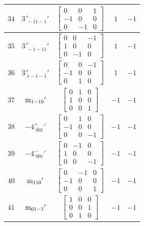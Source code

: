 \documentclass[fleqn,8pt]{jsarticle}
\begin{document}
\begin{longtable}{ccccc}
$ 34 $ & $ 3^{+}_{\,\,-11-1}{}' $ & $ \begin{bmatrix} 0 & 0 & 1 \\ -1 & 0 & 0 \\ 0 & -1 & 0 \end{bmatrix} $ & $ 1 $ & $ -1 $ \\ \hline
$ 35 $ & $ 3^{+}_{\,\,-1-11}{}' $ & $ \begin{bmatrix} 0 & 0 & -1 \\ 1 & 0 & 0 \\ 0 & -1 & 0 \end{bmatrix} $ & $ 1 $ & $ -1 $ \\ \hline
$ 36 $ & $ 3^{+}_{\,\,1-1-1}{}' $ & $ \begin{bmatrix} 0 & 0 & -1 \\ -1 & 0 & 0 \\ 0 & 1 & 0 \end{bmatrix} $ & $ 1 $ & $ -1 $ \\ \hline
$ 37 $ & $ {\rm m}_{1-10}{}' $ & $ \begin{bmatrix} 0 & 1 & 0 \\ 1 & 0 & 0 \\ 0 & 0 & 1 \end{bmatrix} $ & $ -1 $ & $ -1 $ \\ \hline
$ 38 $ & $ -4^{+}_{\,\,001}{}' $ & $ \begin{bmatrix} 0 & 1 & 0 \\ -1 & 0 & 0 \\ 0 & 0 & -1 \end{bmatrix} $ & $ -1 $ & $ -1 $ \\ \hline
$ 39 $ & $ -4^{-}_{\,\,001}{}' $ & $ \begin{bmatrix} 0 & -1 & 0 \\ 1 & 0 & 0 \\ 0 & 0 & -1 \end{bmatrix} $ & $ -1 $ & $ -1 $ \\ \hline
$ 40 $ & $ {\rm m}_{110}{}' $ & $ \begin{bmatrix} 0 & -1 & 0 \\ -1 & 0 & 0 \\ 0 & 0 & 1 \end{bmatrix} $ & $ -1 $ & $ -1 $ \\ \hline
$ 41 $ & $ {\rm m}_{01-1}{}' $ & $ \begin{bmatrix} 1 & 0 & 0 \\ 0 & 0 & 1 \\ 0 & 1 & 0 \end{bmatrix} $ & $ -1 $ & $ -1 $ \\ \hline

\end{longtable}
\end{document}
